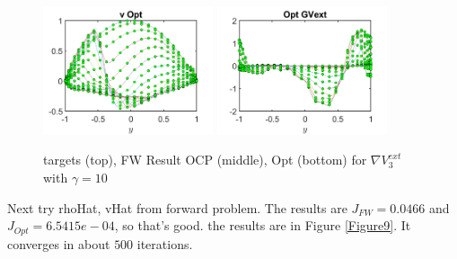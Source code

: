 \documentclass[11pt, a4paper]{article}
\theoremstyle{definition}
\begin{document}
\begin{figure}
	\includegraphics[width=5cm]{Optv1.png}
	\includegraphics[width=5cm]{OptCont1.png}
	\caption{targets (top), FW Result OCP (middle), Opt (bottom) for $\nabla V^{ext}_3 $ with $\gamma =10$}
	\label{Figure8}
\end{figure}

Next try rhoHat, vHat from forward problem. The results are $J_{FW} = 0.0466$ and $J_{Opt} = 6.5415e-04$, so that's good. the results are in Figure \ref{Figure9}. It converges in about $500$ iterations.
\end{document}
